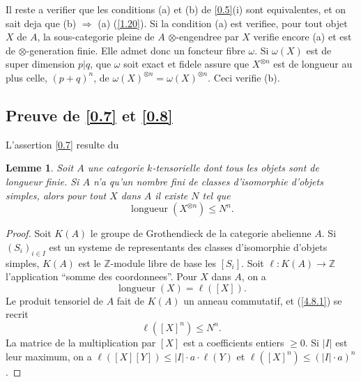 \documentclass[11pt,a4paper]{article}
\theoremstyle{plain}
\newtheorem{lemma}[theorem]{Lemme}
\theoremstyle{definition}
\DeclareMathOperator{\longueur}{longueur}
\begin{document}
Il reste a verifier que les conditions (a) et (b) de \ref{0.5}(i) sont equivalentes, et on sait deja que (b) $\Rightarrow$ (a) (\ref{1.20}). Si la condition (a) est verifiee, pour tout objet $X$ de $A$, la sous-categorie pleine de $A$ $\otimes$-engendree par $X$ verifie encore (a) et est de $\otimes$-generation finie. Elle admet donc un foncteur fibre $\omega$. Si $\omega(X)$ est de super dimension $p|q$, que $\omega$ soit exact et fidele assure que $X^{\otimes n}$ est de longueur au plus celle, $(p+q)^n$, de $\omega(X)^{\otimes n}=\omega(X)^{\otimes n}$. Ceci verifie (b).

\subsection{Preuve de \ref{0.7} et \ref{0.8}}\label{4.7}

L'assertion \ref{0.7} resulte du

\begin{lemma}\label{4.8}
Soit $A$ une categorie $k$-tensorielle dont tous les objets sont de longueur finie. Si $A$ n'a qu'un nombre fini de classes d'isomorphie d'objets simples, alors pour tout $X$ dans $A$ il existe $N$ tel que
\begin{equation}\label{4.8.1}
\longueur(X^{\otimes n})\leq N^n.
\end{equation}
\end{lemma}

\begin{proof}
Soit $K(A)$ le groupe de Grothendieck de la categorie abelienne $A$. Si $(S_i)_{i\in I}$ est un systeme de representants des classes d'isomorphie d'objets simples, $K(A)$ est le $\mathbb{Z}$-module libre de base les $[S_i]$. Soit $\ell:K(A)\to\mathbb{Z}$ l'application ``somme des coordonnees''. Pour $X$ dans $A$, on a
\[
\longueur(X)=\ell([X]).
\]
Le produit tensoriel de $A$ fait de $K(A)$ un anneau commutatif, et (\ref{4.8.1}) se recrit
\[
\ell([X]^n)\leq N^n.
\]
La matrice de la multiplication par $[X]$ est a coefficients entiers $\geq0$. Si $|I|$ est leur maximum, on a $\ell([X][Y])\leq|I|\cdot a\cdot\ell(Y)$ et $\ell([X]^n)\leq(|I|\cdot a)^n$.
\end{proof}
\end{document}
